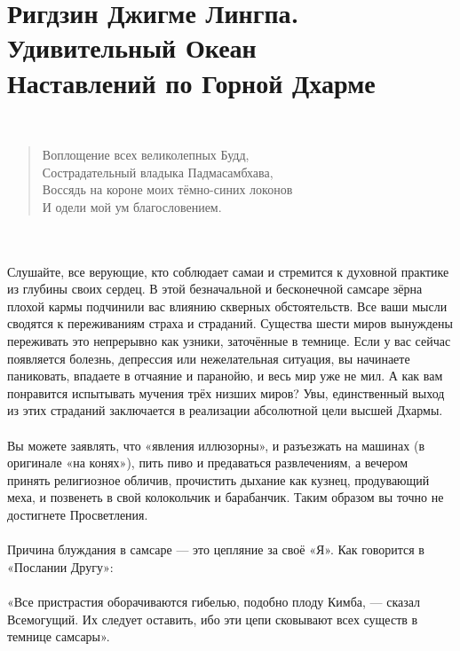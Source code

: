 \newpage
\section{Ригдзин Джигме Лингпа.\\
Удивительный Океан\\
Наставлений по Горной Дхарме}
\\
\begin{verse}
Воплощение всех великолепных Будд,\\
Сострадательный владыка Падмасамбхава,\\
Воссядь на короне моих тёмно-синих локонов\\
И одели мой ум благословением.
\end{verse}

\\ \\ Слушайте, все верующие, кто соблюдает самаи и стремится к духовной практике из глубины своих сердец. В этой безначальной и бесконечной самсаре зёрна плохой кармы подчинили вас влиянию скверных обстоятельств. Все ваши мысли сводятся к переживаниям страха и страданий. Существа шести миров вынуждены переживать это непрерывно как узники, заточённые в темнице. Если у вас сейчас появляется болезнь, депрессия или нежелательная ситуация, вы начинаете паниковать, впадаете в отчаяние и паранойю, и весь мир уже не мил. А как вам понравится испытывать мучения трёх низших миров? Увы, единственный выход из этих страданий заключается в реализации абсолютной цели высшей Дхармы.
\\ \\ Вы можете заявлять, что «явления иллюзорны», и разъезжать на машинах (в оригинале «на конях»), пить пиво и предаваться развлечениям, а вечером принять религиозное обличив, прочистить дыхание как кузнец, продувающий меха, и позвенеть в свой колокольчик и барабанчик. Таким образом вы точно не достигнете Просветления.
\\ \\ Причина блуждания в самсаре — это цепляние за своё «Я». Как говорится в «Послании Другу»:
\\ \\ «Все пристрастия оборачиваются гибелью, подобно плоду Кимба, — сказал Всемогущий. Их следует оставить, ибо эти цепи сковывают всех существ в темнице самсары».
\newpage
